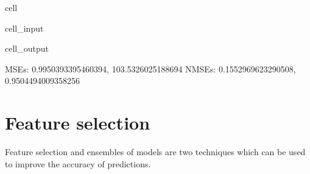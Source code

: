 \documentclass[letterpaper,10pt,english]{jupyterBook}
\begin{document}
\begin{sphinxuseclass}{cell}\begin{sphinxVerbatimInput}

\begin{sphinxuseclass}{cell_input}
\begin{sphinxVerbatim}[commandchars=\\\{\}]
\end{sphinxVerbatim}

\end{sphinxuseclass}\end{sphinxVerbatimInput}
\begin{sphinxVerbatimOutput}

\begin{sphinxuseclass}{cell_output}
\begin{sphinxVerbatim}[commandchars=\\\{\}]
MSEs: 0.9950393395460394, 103.5326025188694
NMSEs: 0.1552969623290508, 0.9504494009358256
\end{sphinxVerbatim}

\end{sphinxuseclass}\end{sphinxVerbatimOutput}

\end{sphinxuseclass}

\section{Feature selection}
\label{\detokenize{05:feature-selection}}
\sphinxAtStartPar
Feature selection and ensembles of models are two techniques which can be used to improve the accuracy of predictions.
\end{document}
